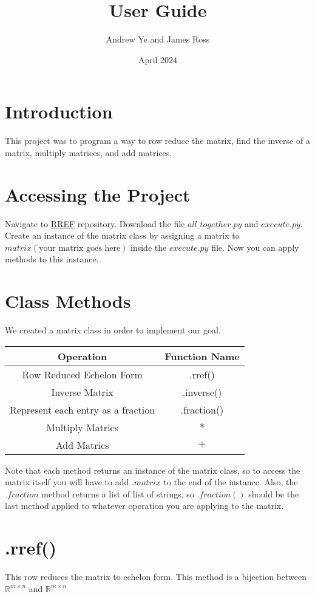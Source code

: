 \documentclass{article}
\title{User Guide}
\author{Andrew Ye and James Ross}
\date{April 2024}
\begin{document}
\maketitle
\newpage
\tableofcontents
\newpage

\section{Introduction}
This project was to program a way to row reduce the matrix, find the inverse of a matrix, multiply matrices, and add matrices. 

\section{Accessing the Project}
Navigate to \href{https://github.com/AndrewYe12/RREF/blob/main/all_together.py}{RREF} repository. Download the file \(all\_together.py\) and \(execute.py\). 
Create an instance of the matrix class by assigning a matrix to \(matrix(\text{your matrix goes here})\) inside the \(execute.py\) file. Now you can apply methods to this instance.


\section{Class Methods}
We created a matrix class in order to implement our goal.
\begin{center}
\begin{tabular}{||c|c||}
    \hline
    Operation & Function Name \\ [0.5ex]
    \hline\hline
    Row Reduced Echelon Form & .rref() \\
    Inverse Matrix & .inverse() \\
    Represent each entry as a fraction & .fraction() \\
    Multiply Matrics & \(*\) \\
    Add Matrics & \(+\) \\ [1ex]
    \hline 
\end{tabular}
\end{center}
Note that each method returns an instance of the matrix class, so to access the matrix itself you will have to add \(.matrix\) to the end of the instance. 
Also, the \(.fraction\) method returns a list of list of strings, so \(.fraction()\) should be the last method applied to whatever operation you are applying to the
matrix. 

\section{.rref()}
This row reduces the matrix to echelon form. This method is a bijection between \(\mathbb{R}^{m \times n}\) and \(\mathbb{R}^{m \times n}\)
\end{document}
